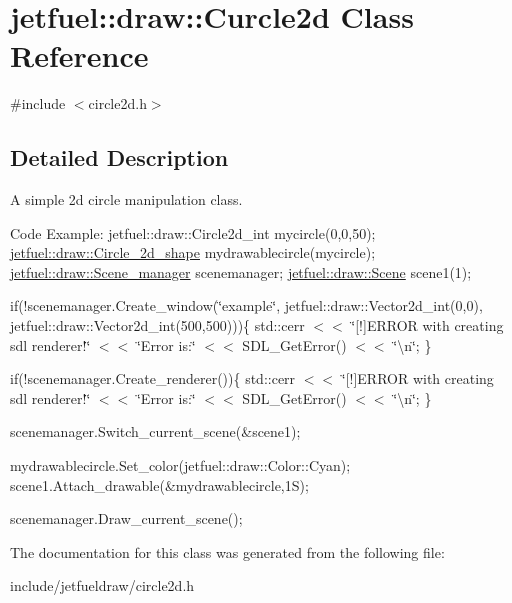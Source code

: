 \hypertarget{classjetfuel_1_1draw_1_1Curcle2d}{}\section{jetfuel\+:\+:draw\+:\+:Curcle2d Class Reference}
\label{classjetfuel_1_1draw_1_1Curcle2d}


{\ttfamily \#include $<$circle2d.\+h$>$}



\subsection{Detailed Description}
A simple 2d circle manipulation class.

Code Example\+: jetfuel\+::draw\+::\+Circle2d\+\_\+int mycircle(0,0,50); \hyperlink{classjetfuel_1_1draw_1_1Circle__2d__shape}{jetfuel\+::draw\+::\+Circle\+\_\+2d\+\_\+shape} mydrawablecircle(mycircle); \hyperlink{classjetfuel_1_1draw_1_1Scene__manager}{jetfuel\+::draw\+::\+Scene\+\_\+manager} scenemanager; \hyperlink{classjetfuel_1_1draw_1_1Scene}{jetfuel\+::draw\+::\+Scene} scene1(1);

if(!scenemanager.Create\+\_\+window(\char`\"{}example\char`\"{}, jetfuel\+::draw\+::\+Vector2d\+\_\+int(0,0), jetfuel\+::draw\+::\+Vector2d\+\_\+int(500,500)))\{ std\+::cerr $<$$<$ \char`\"{}\mbox{[}!\mbox{]}\+E\+R\+R\+O\+R with creating sdl renderer!\char`\"{} $<$$<$ \char`\"{}\+Error is\+:\char`\"{} $<$$<$ S\+D\+L\+\_\+\+Get\+Error() $<$$<$ \char`\"{}\textbackslash{}n\char`\"{}; \}

if(!scenemanager.Create\+\_\+renderer())\{ std\+::cerr $<$$<$ \char`\"{}\mbox{[}!\mbox{]}\+E\+R\+R\+O\+R with creating sdl renderer!\char`\"{} $<$$<$ \char`\"{}\+Error is\+:\char`\"{} $<$$<$ S\+D\+L\+\_\+\+Get\+Error() $<$$<$ \char`\"{}\textbackslash{}n\char`\"{}; \}

scenemanager.\+Switch\+\_\+current\+\_\+scene(\&scene1);

mydrawablecircle.\+Set\+\_\+color(jetfuel\+::draw\+::\+Color\+::\+Cyan); scene1.\+Attach\+\_\+drawable(\&mydrawablecircle,1\+S);

scenemanager.\+Draw\+\_\+current\+\_\+scene(); 

The documentation for this class was generated from the following file\+:\begin{DoxyCompactItemize}
\item 
include/jetfueldraw/circle2d.\+h\end{DoxyCompactItemize}
